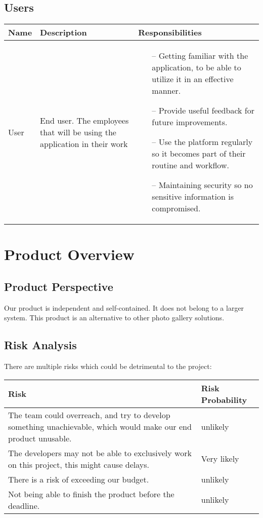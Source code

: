 \documentclass{article}
\begin{document}
\subsection{Users}
\begin{tabularx}{1.0\textwidth} { 
  | >{\raggedright\arraybackslash}X 
  | >{\raggedright\arraybackslash}X
  | >{\raggedright\arraybackslash}X | }
    \hline
    \rowcolor{lightgray} Name & Description & Responsibilities \\
    \hline
    User & End user. The employees that will be using the application in their work & \begin{itemize}
        \item[--] Getting familiar with the application, to be able to utilize it in an effective manner.
        \item[--] Provide useful feedback for future improvements.
        \item[--] Use the platform regularly so it becomes part of their routine and workflow.
        \item[--] Maintaining security so no sensitive information is compromised. 
    \end{itemize}{} \\
    \hline
\end{tabularx}


\section{Product Overview}
\subsection{Product Perspective}
Our product is independent and self-contained. It does not belong to a larger system. This product is an alternative to other photo gallery solutions. 
\subsection{Risk Analysis}
There are multiple risks which could be detrimental to the project: 


\begin{tabularx}{1.0\textwidth} { 
  | >{\raggedright\arraybackslash}X 
  | >{\raggedright\arraybackslash}X | }
    \hline
    \rowcolor{lightgray} Risk & Risk Probability \\
    \hline
    The team could overreach, and try to develop something unachievable, which would make our end product unusable. & unlikely \\
    \hline
    The developers may not be able to exclusively work on this project, this might cause delays. & Very likely \\
    \hline
    There is a risk of exceeding our budget. & unlikely \\
    \hline
    Not being able to finish the product before the deadline. & unlikely \\
    \hline
\end{tabularx}
\end{document}
